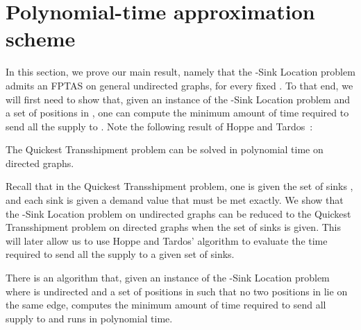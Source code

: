 \documentclass[a4paper,10pt]{llncs}
\begin{document}
\section{Polynomial-time approximation scheme}

In this section, we prove our main result, namely that the -{\sc Sink Location} problem admits an FPTAS on general undirected graphs, for every fixed . To that end, we will first need to show that, given an instance  of the -{\sc Sink Location} problem and a set of  positions  in , one can compute the minimum amount of time required to send all the supply to . Note the following result of Hoppe and Tardos~\cite{HT00}:
\begin{theorem}[\cite{HT00}]
The {\sc Quickest Transshipment} problem can be solved in polynomial time on directed graphs.
\end{theorem}
Recall that in the {\sc Quickest Transshipment} problem, one is given the set of sinks , and each sink  is given a demand value that must be met exactly. We show that the -{\sc Sink Location} problem on undirected graphs can be reduced to the {\sc Quickest Transshipment} problem on directed graphs when the set of sinks is given. This will later allow us to use Hoppe and Tardos' algorithm to evaluate the time required to send all the supply to a given set of sinks.

\begin{lemma}
\label{lem:reduction}
There is an algorithm that, given an instance  of the -{\sc Sink Location} problem where  is undirected and a set of  positions  in  such that no two positions in  lie on the same edge, computes the minimum amount of time required to send all supply to  and runs in polynomial time.
\end{lemma}
\end{document}
